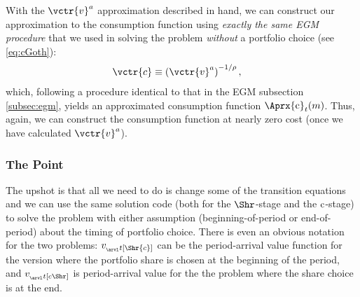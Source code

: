 \documentclass[titlepage, headings=optiontotocandhead]{Resources/texmf-local/tex/latex/econtex}
\begin{document}
With the $\vctr{v}^{a}$ approximation described in hand, we can construct our approximation to the consumption function using \emph{exactly the same EGM procedure} that we used in solving the problem \emph{without} a portfolio choice (see \eqref{eq:cGoth}):
\begin{equation}\begin{gathered}\begin{aligned}
      \vctr{c}  & \equiv  \left(\vctr{v}^{a}\right)^{-1/\rho} \label{eq:cVecPort},
    \end{aligned}\end{gathered}\end{equation}
which, following a procedure identical to that in the EGM subsection \ref{subsec:egm}, yields an approximated consumption function $\Aprx{\cFunc}_{t}(m)$.  Thus, again, we can construct the consumption function at nearly zero cost (once we have calculated $\vctr{v}^{a}$).

\hypertarget{the-point}{}

\subsubsection{The Point}\label{subsubsec:the-point}

The upshot is that all we need to do is change some of the transition equations and we can use the same solution code (both for the $\Shr$-stage and the $\mathrm{c}$-stage) to solve the problem with either assumption (beginning-of-period or end-of-period) about the timing of portfolio choice.  There is even an obvious notation for the two problems: $v_{_\arvl t[\Shr{c}]}$ can be the {period}-arrival value function for the version where the portfolio share is chosen at the beginning of the period, and $v_{_\arvl t[{c}\Shr]}$ is {period}-arrival value for the the problem where the share choice is at the end.
\end{document}
